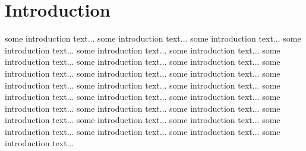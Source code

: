 \chapter{Introduction}

some introduction text...
some introduction text...
some introduction text...
some introduction text...
some introduction text...
some introduction text...
some introduction text...
some introduction text...
some introduction text...
some introduction text...
some introduction text...
some introduction text...
some introduction text...
some introduction text...
some introduction text...
some introduction text...
some introduction text...
some introduction text...
some introduction text...
some introduction text...
some introduction text...
some introduction text...
some introduction text...
some introduction text...
some introduction text...
some introduction text...
some introduction text...
some introduction text...